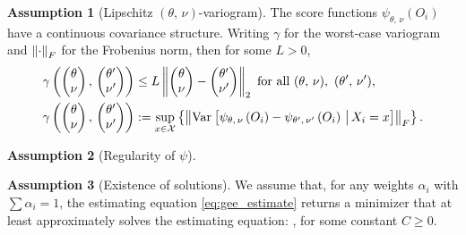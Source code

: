 \documentclass[aos]{imsart}
\theoremstyle{plain}
\theoremstyle{definition}
\newtheorem{assu}{Assumption}
\theoremstyle{remark}
\begin{document}
\begin{CJK}{UTF8}{gbsn}
\begin{assu}[Lipschitz $(\theta, \, \nu)$-variogram]
\label{assu:covariance}
The score functions $\psi_{\theta, \, \nu}(O_i)$ 
have a continuous covariance structure.
Writing $\gamma$ for the worst-case variogram
and $\left\lVert\cdot\right\rVert_F$ for the Frobenius norm,
then for some $L > 0$,
\begin{equation}
\label{eq:variogram}
\begin{split}
&\gamma\p{ \begin{pmatrix} \theta \\ \nu \end{pmatrix}, \,  \begin{pmatrix} \theta' \\ \nu' \end{pmatrix}} \leq
L \Norm{\begin{pmatrix} \theta \\ \nu \end{pmatrix} -   \begin{pmatrix} \theta' \\ \nu' \end{pmatrix}}_2
\text{ for all } (\theta,\, \nu), \ (\theta',\,\nu'), \\
&\gamma\p{ \begin{pmatrix} \theta \\ \nu \end{pmatrix}, \,  \begin{pmatrix} \theta' \\ \nu' \end{pmatrix}}
:= \sup_{x \in \xx} \cb{\Norm{\Var{\psi_{\theta, \, \nu}\p{O_i} - \psi_{\theta', \, \nu'}\p{O_i} \cond X_i = x}}_F}.
\end{split}
\end{equation}
\end{assu}

\begin{assu}[Regularity of $\psi$]
\label{assu:donsker}
\end{assu}

\begin{assu}[Existence of solutions]
\label{assu:existence}
We assume that, for any weights $\alpha_i$ with $\sum \alpha_i = 1$,
the estimating equation \eqref{eq:gee_estimate} returns a
minimizer \smash{$(\htheta, \, \hnu)$} that at least approximately
solves the estimating equation:
,
for some constant $C \geq 0$.
\end{assu}


\end{CJK}
\end{document}
